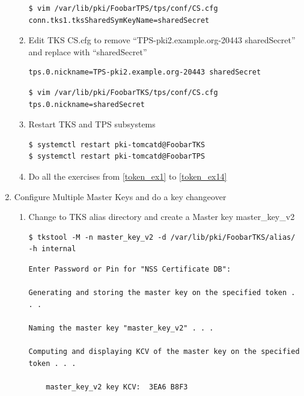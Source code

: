 \documentclass[12pt]{report}
\begin{document}
\begin{enumerate}[label*=\arabic*.]
\begin{enumerate}[label*=\arabic*.]
            \begin{lstlisting}[style=bashInputStyle]
$ vim /var/lib/pki/FoobarTPS/tps/conf/CS.cfg
conn.tks1.tksSharedSymKeyName=sharedSecret
            \end{lstlisting}
        \item Edit TKS CS.cfg to remove ``TPS-pki2.example.org-20443 sharedSecret'' and replace with ``sharedSecret''
            \begin{lstlisting}
tps.0.nickname=TPS-pki2.example.org-20443 sharedSecret            
            \end{lstlisting}
            \begin{lstlisting}[style=bashInputStyle]
$ vim /var/lib/pki/FoobarTKS/tps/conf/CS.cfg
tps.0.nickname=sharedSecret
            \end{lstlisting}
        \item Restart TKS and TPS subsystems
            \begin{lstlisting}[style=bashInputStyle]
$ systemctl restart pki-tomcatd@FoobarTKS
$ systemctl restart pki-tomcatd@FoobarTPS
            \end{lstlisting}
        \item Do all the exercises from \ref{token_ex1} to \ref{token_ex14}
        \end{enumerate}            
        \item Configure Multiple Master Keys and do a key changeover
             \begin{enumerate}[label*=\arabic*.]
                \item Change to TKS alias directory and create a Master key master\_key\_v2
                    \begin{lstlisting}[style=bashInputStyle]
$ tkstool -M -n master_key_v2 -d /var/lib/pki/FoobarTKS/alias/ -h internal                    
                    \end{lstlisting}
                    \begin{lstlisting}
Enter Password or Pin for "NSS Certificate DB":

Generating and storing the master key on the specified token . . .

Naming the master key "master_key_v2" . . .

Computing and displaying KCV of the master key on the specified token . . .

    master_key_v2 key KCV:  3EA6 B8F3



\end{lstlisting}
\end{enumerate}
\end{enumerate}
\end{document}
